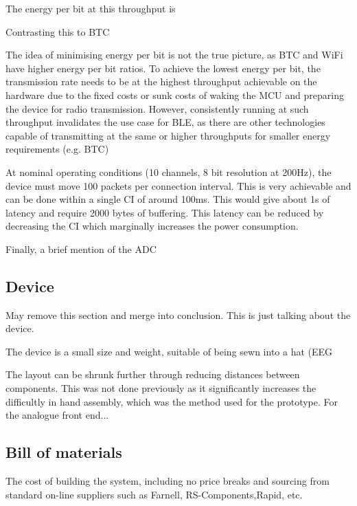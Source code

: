 \documentclass[]{article}
\begin{document}
The energy per bit at this throughput is 

Contrasting this to \ac{BTC}

The idea of minimising energy per bit is not the true picture, as \ac{BTC} and WiFi have higher energy per bit ratios. To achieve the lowest energy per bit, the transmission rate needs to be at the highest throughput achievable on the hardware due to the fixed costs or sunk costs of waking the \ac{MCU} and preparing the device for radio transmission. However, consistently running at such throughput invalidates the use case for \ac{BLE}, as there are other technologies capable of transmitting at the same or higher throughputs for smaller energy requirements (e.g. \ac{BTC})


At nominal operating conditions (10 channels, 8 bit resolution at 200Hz), the device must move 100 packets per connection interval. This is very achievable and can be done within a single \ac{CI} of around 100ms. This would give about 1s of latency and require 2000 bytes of buffering. This latency can be reduced by decreasing the \ac{CI} which marginally increases the power consumption. 

Finally, a brief mention of the \ac{ADC}










\subsection{Device}


May remove this section and merge into conclusion. This is just talking about the device.

The device is a small size and weight, suitable of being sewn into a hat (EEG

The layout can be shrunk further through reducing distances between components. This was not done previously as it significantly increases the difficultly in hand assembly, which was the method used for the prototype. For the analogue front end...


\subsection{Bill of materials}

The cost of building the system, including no price breaks and sourcing from standard on-line suppliers such as Farnell, RS-Components,Rapid, etc.
\end{document}
